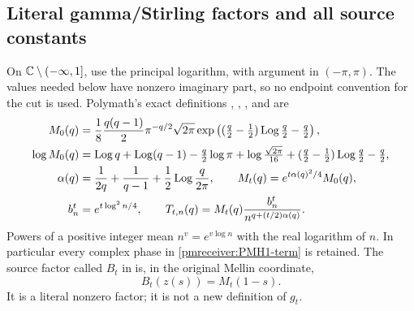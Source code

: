 \documentclass[11pt]{article}
\begin{document}
\subsection{Literal gamma/Stirling factors and all source constants}

On $\mathbb C\setminus(-\infty,1]$, use the principal logarithm, with argument
in $(-\pi,\pi)$. The values needed below have nonzero imaginary part,
so no endpoint convention for the cut is used. Polymath's exact
definitions , , , and 
are
\begin{align}
 M_0(q)&=\frac18\frac{q(q-1)}2\pi^{-q/2}\sqrt{2\pi}
 \exp\left((\tfrac q2-\tfrac12)\operatorname{Log}\tfrac q2-\tfrac q2\right),
 \label{pmreceiver:PMH1-M0}\\
 \log M_0(q)&=\operatorname{Log} q+\operatorname{Log}(q-1)-\tfrac q2\log\pi
 +\log\tfrac{\sqrt{2\pi}}{16}
 +(\tfrac q2-\tfrac12)\operatorname{Log}\tfrac q2-\tfrac q2,
 \label{pmreceiver:PMH1-logM}\\
 \alpha(q)&=\frac1{2q}+\frac1{q-1}+\frac12\operatorname{Log}\frac q{2\pi},
 \qquad M_t(q)=e^{t\alpha(q)^2/4}M_0(q),
 \label{pmreceiver:PMH1-alpha}\\
 b_n^t&=e^{t\log^2n/4},\qquad
 T_{t,n}(q)=M_t(q)\frac{b_n^t}{n^{q+(t/2)\alpha(q)}}.
 \label{pmreceiver:PMH1-term}
\end{align}
Powers of a positive integer mean $n^v=e^{v\log n}$ with the real
logarithm of $n$. In particular every complex phase in
\eqref{pmreceiver:PMH1-term} is retained. The source factor called $B_t$ in
 is, in the original Mellin coordinate,
\begin{equation}\label{pmreceiver:PMH1-B}
 B_t(z(s))=M_t(1-s).
\end{equation}
It is a literal nonzero factor; it is not a new definition of $g_t$.
\end{document}

